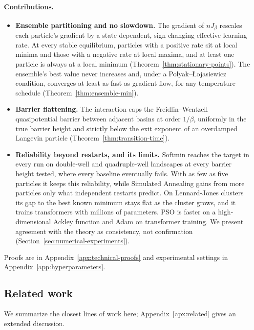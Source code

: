 \documentclass{article} %
\theoremstyle{plain}
\theoremstyle{definition}
\theoremstyle{remark}
\begin{document}
\paragraph{Contributions.}
\begin{itemize}
    \item \textbf{Ensemble partitioning and no slowdown.} The gradient of $nJ_\beta$ rescales each particle's gradient by a state-dependent, sign-changing effective learning rate. At every stable equilibrium, particles with a positive rate sit at local minima and those with a negative rate at local maxima, and at least one particle is always at a local minimum (Theorem~\ref{thm:stationary-points}). The ensemble's best value never increases and, under a Polyak--\L{}ojasiewicz condition, converges at least as fast as gradient flow, for any temperature schedule (Theorem~\ref{thm:ensemble-min}).
    \item \textbf{Barrier flattening.} The interaction caps the Freidlin--Wentzell quasipotential barrier between adjacent basins at order $1/\beta$, uniformly in the true barrier height and strictly below the exit exponent of an overdamped Langevin particle (Theorem~\ref{thm:transition-time}).
    \item \textbf{Reliability beyond restarts, and its limits.} Softmin reaches the target in every run on double-well and quadruple-well landscapes at every barrier height tested, where every baseline eventually fails. With as few as five particles it keeps this reliability, while Simulated Annealing gains from more particles only what independent restarts predict. On Lennard-Jones clusters its gap to the best known minimum stays flat as the cluster grows, and it trains transformers with millions of parameters. PSO is faster on a high-dimensional Ackley function and Adam on transformer training. We present agreement with the theory as consistency, not confirmation (Section~\ref{sec:numerical-experiments}).
\end{itemize}
Proofs are in Appendix~\ref{apx:technical-proofs} and experimental settings in Appendix~\ref{app:hyperparameters}.

\subsection{Related work}
\label{sec:related}
We summarize the closest lines of work here; Appendix~\ref{apx:related} gives an extended discussion.
\end{document}

